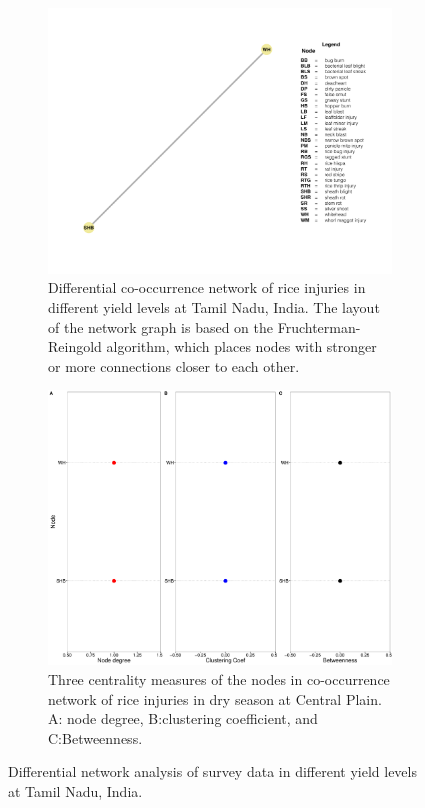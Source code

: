  \begin{figure}
    \centering
    \begin{subfigure}[b]{1\textwidth}
        \includegraphics[width = 1\textwidth]{figures/difyieldTM/difyieldTM.pdf}
        \caption[Differential co-occurrence network of rice injuries in different yield levels at Tamil Nadu, India.]{Differential co-occurrence network of rice injuries in different yield levels at Tamil Nadu, India. The layout of the network graph is based on the Fruchterman-Reingold algorithm, which places nodes with stronger or more connections closer to each other.}
        \label{fig:difyieldnetwork_TM}
    \end{subfigure}
    \begin{subfigure}[b]{1\textwidth}
        \includegraphics[width = 1\textwidth]{figures/yield_dif_nodepropTamil_Nadu/yield_dif_nodepropTamil_Nadu.pdf}
        \caption{Three centrality measures of the nodes in co-occurrence network of rice injuries in dry season at Central Plain. A: node degree, B:clustering coefficient, and C:Betweenness.}
        \label{fig:nodepropdifyield_TM}
    \end{subfigure}
    \caption{Differential network analysis of survey data in different yield levels at Tamil Nadu, India.}
    \label{fig:yielddif_TM}
\end{figure}
 
